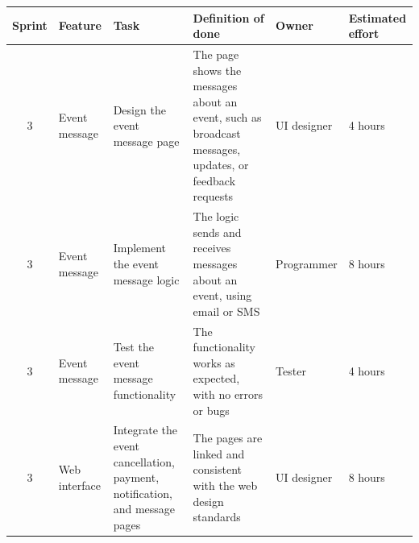 \documentclass[a4paper,12pt]{article}
\begin{document}
\newpage\noindent
\begin{landscape}
\begin{table}[!h]
\centering
\begin{tabular}{|c|l|p{7cm}|p{6cm}|l|p{2cm}|}
\hline
\textbf{Sprint} & \textbf{Feature} & \textbf{Task} & \textbf{Definition of done} & \textbf{Owner} & \textbf{Estimated effort} \\
\hline
3 & Event message & Design the event message page & The page shows the messages about an event, such as broadcast messages, updates, or feedback requests & UI designer & 4 hours \\
\hline
3 & Event message & Implement the event message logic & The logic sends and receives messages about an event, using email or SMS & Programmer & 8 hours \\
\hline
3 & Event message & Test the event message functionality & The functionality works as expected, with no errors or bugs & Tester & 4 hours \\
\hline
3 & Web interface & Integrate the event cancellation, payment, notification, and message pages & The pages are linked and consistent with the web design standards & UI designer & 8 hours \\
\hline
\end{tabular}
\end{table}
\end{landscape}
\end{document}
